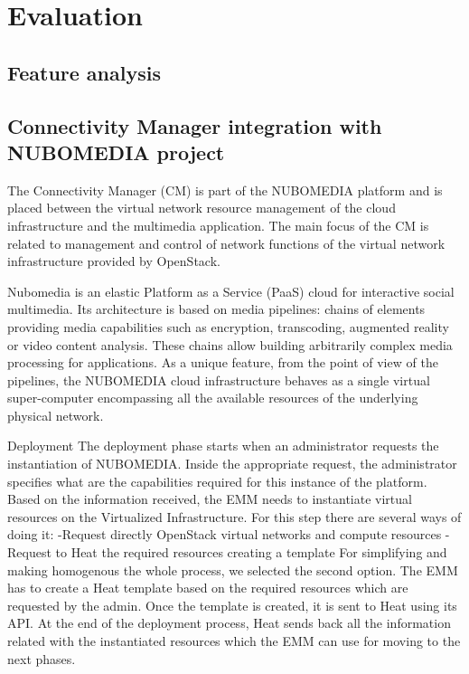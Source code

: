 \chapter{Evaluation}

\section{Feature analysis}



\section{Connectivity Manager integration with NUBOMEDIA project}


The Connectivity Manager (CM) is part of the NUBOMEDIA platform and is placed between the virtual network resource management of the cloud infrastructure and the
multimedia application. The main focus of the CM is related to management and control of network functions of the virtual network infrastructure provided by OpenStack.

Nubomedia is an elastic Platform as a Service (PaaS) cloud for interactive social multimedia. Its architecture is based on media pipelines: chains of elements providing media capabilities such as encryption, transcoding, augmented reality or video content analysis. These chains allow building arbitrarily complex media processing for applications. As a unique feature, from the point of view of the pipelines, the NUBOMEDIA cloud infrastructure behaves as a single virtual super-computer encompassing all the available resources of the underlying physical network.




Deployment
The deployment phase starts when an administrator requests the instantiation of
NUBOMEDIA. Inside the appropriate request, the administrator specifies what are the
capabilities required for this instance of the platform. Based on the information
received, the EMM needs to instantiate virtual resources on the Virtualized
Infrastructure. For this step there are several ways of doing it:
-Request directly OpenStack virtual networks and compute resources
-Request to Heat the required resources creating a template
For simplifying and making homogenous the whole process, we selected the second
option. The EMM has to create a Heat template based on the required resources which
are requested by the admin. Once the template is created, it is sent to Heat using its API.
At the end of the deployment process, Heat sends back all the information related with
the instantiated resources which the EMM can use for moving to the next phases.


